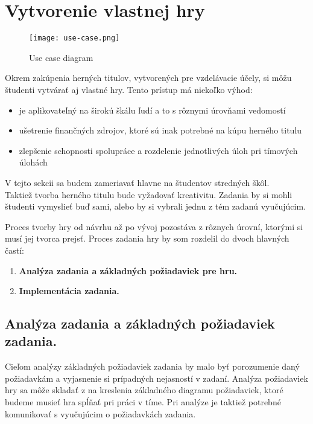 \section{Vytvorenie vlastnej hry}\label{vytvorenie-vlastnej-hry}

\begin{figure}
	\texttt{[image: use-case.png]}
	\caption{Use case diagram}
	\label{use-case-tvorba-hry}
\end{figure}


Okrem zakúpenia herných titulov, vytvorených pre vzdelávacie účely, si môžu študenti vytvárať aj vlastné hry.
Tento prístup má niekoľko výhod: 
	\begin{itemize}
		\item je aplikovateľný na širokú škálu ľudí a to s rôznymi úrovňami vedomostí
		\item ušetrenie finančných zdrojov, ktoré sú inak potrebné na kúpu herného titulu
		\item zlepšenie schopnosti spolupráce a rozdelenie jednotlivých úloh pri tímových úlohách 
	\end{itemize}

V tejto sekcii sa budem zameriavať hlavne na študentov stredných škôl.\\

Taktiež tvorba herného titulu bude vyžadovať kreativitu.
Zadania by si mohli študenti vymyslieť buď sami, alebo by si vybrali jednu z tém zadanú vyučujúcim.

Proces tvorby hry od návrhu až po vývoj pozostáva z rôznych úrovní, ktorými si musí jej tvorca prejsť.
Proces zadania hry by som rozdelil do dvoch hlavných častí:
	\begin{enumerate}
		\item \textbf{Analýza zadania a základných požiadaviek pre hru.}
		\item \textbf{Implementácia zadania.}
	\end{enumerate}


	\subsection{Analýza zadania a základných požiadaviek zadania.}\label{analyza-zadania}
	Cieľom analýzy základných požiadaviek zadania by malo byť porozumenie 
	daný požiadavkám a vyjasnenie si prípadných nejasností v zadaní. Analýza požiadaviek 
	hry sa môže skladať z na kreslenia základného diagramu požiadaviek,
	ktoré budeme musieť hra spĺňať pri práci v tíme. Pri analýze je taktiež potrebné komunikovať 
	s vyučujúcim o požiadavkách zadania. 


